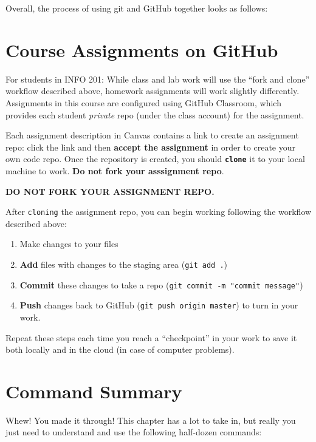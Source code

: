 \documentclass[]{book}
\providecommand{\tightlist}{%
  \setlength{\itemsep}{0pt}\setlength{\parskip}{0pt}}
\theoremstyle{definition}
\theoremstyle{definition}
\theoremstyle{remark}
\begin{document}
Overall, the process of using git and GitHub together looks as follows:

\section{Course Assignments on
GitHub}\label{course-assignments-on-github}

For students in INFO 201: While class and lab work will use the ``fork
and clone'' workflow described above, homework assignments will work
slightly differently. Assignments in this course are configured using
GitHub Classroom, which provides each student \emph{private} repo (under
the class account) for the assignment.

Each assignment description in Canvas contains a link to create an
assignment repo: click the link and then \textbf{accept the assignment}
in order to create your own code repo. Once the repository is created,
you should \textbf{\texttt{clone}} it to your local machine to work.
\textbf{Do not fork your asssignment repo}.

\textbf{DO NOT FORK YOUR ASSIGNMENT REPO.}

After \texttt{cloning} the assignment repo, you can begin working
following the workflow described above:

\begin{enumerate}
\def\labelenumi{\arabic{enumi}.}
\tightlist
\item
  Make changes to your files
\item
  \textbf{Add} files with changes to the staging area
  (\texttt{git\ add\ .})
\item
  \textbf{Commit} these changes to take a repo
  (\texttt{git\ commit\ -m\ "commit\ message"})
\item
  \textbf{Push} changes back to GitHub
  (\texttt{git\ push\ origin\ master}) to turn in your work.
\end{enumerate}

Repeat these steps each time you reach a ``checkpoint'' in your work to
save it both locally and in the cloud (in case of computer problems).

\section{Command Summary}\label{command-summary}

Whew! You made it through! This chapter has a lot to take in, but really
you just need to understand and use the following half-dozen commands:
\end{document}

